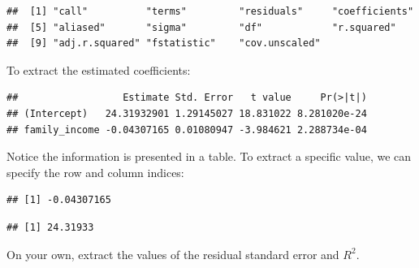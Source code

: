 \documentclass[
]{book}
\newenvironment{Shaded}{\begin{snugshade}}{\end{snugshade}}
\newcommand{\DecValTok}[1]{\textcolor[rgb]{0.00,0.00,0.81}{#1}}
\newcommand{\DocumentationTok}[1]{\textcolor[rgb]{0.56,0.35,0.01}{\textbf{\textit{#1}}}}
\newcommand{\FunctionTok}[1]{\textcolor[rgb]{0.13,0.29,0.53}{\textbf{#1}}}
\newcommand{\NormalTok}[1]{#1}
\newcommand{\SpecialCharTok}[1]{\textcolor[rgb]{0.81,0.36,0.00}{\textbf{#1}}}
\begin{document}
\begin{verbatim}
##  [1] "call"          "terms"         "residuals"     "coefficients" 
##  [5] "aliased"       "sigma"         "df"            "r.squared"    
##  [9] "adj.r.squared" "fstatistic"    "cov.unscaled"
\end{verbatim}

To extract the estimated coefficients:

\begin{Shaded}
\end{Shaded}

\begin{verbatim}
##                  Estimate Std. Error   t value     Pr(>|t|)
## (Intercept)   24.31932901 1.29145027 18.831022 8.281020e-24
## family_income -0.04307165 0.01080947 -3.984621 2.288734e-04
\end{verbatim}

Notice the information is presented in a table. To extract a specific value, we can specify the row and column indices:

\begin{Shaded}
\end{Shaded}

\begin{verbatim}
## [1] -0.04307165
\end{verbatim}

\begin{Shaded}
\end{Shaded}

\begin{verbatim}
## [1] 24.31933
\end{verbatim}

On your own, extract the values of the residual standard error and \(R^2\).
\end{document}
